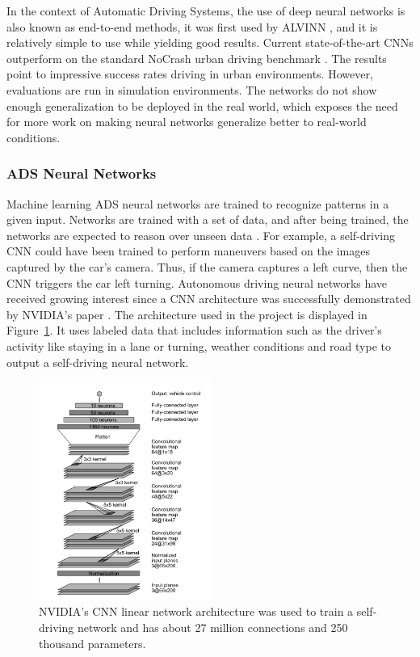 \documentclass[12pt]{article}
\begin{document}
In the context of Automatic Driving Systems, the use of deep neural networks is also known as end-to-end methods, it was first used by ALVINN \parencite{alvinn}, and it is relatively simple to use while yielding good results. Current state-of-the-art CNNs outperform on the standard NoCrash urban driving benchmark \parencite{jeff}. The results point to impressive success rates driving in urban environments. However, evaluations are run in simulation environments. The networks do not show enough generalization to be deployed in the real world, which exposes the need for more work on making neural networks generalize better to real-world conditions. 

\subsubsection{ADS Neural Networks}

Machine learning ADS neural networks are trained to recognize patterns in a given input. Networks are trained with a set of data, and after being trained, the networks are expected to reason over unseen data \parencite{microsoft}. For example, a self-driving CNN could have been trained to perform maneuvers based on the images captured by the car's camera. Thus, if the camera captures a left curve, then the CNN triggers the car left turning. 
Autonomous driving neural networks have received growing interest since a CNN architecture was successfully demonstrated by NVIDIA's paper \parencite{nvidia}. The architecture used in the project is displayed in Figure~\ref{fig:figCNN}. It uses labeled data that includes information such as the driver's activity like staying in a lane or turning, weather conditions and road type to output a self-driving neural network.

\begin{figure} [!ht] %
\begin{center}
\includegraphics[width=0.5\textwidth]{figures/nvidia-paper.png}
\caption{NVIDIA's CNN linear network architecture was used to train a self-driving network and has about 27 million connections and 250 thousand parameters. \parencite{nvidia}}
\label{fig:figCNN}
\end{center}
\end{figure}
\end{document}

